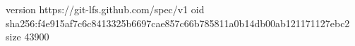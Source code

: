 version https://git-lfs.github.com/spec/v1
oid sha256:f4e915af7c6c8413325b6697cae857c66b785811a0b14db00ab121171127ebc2
size 43900
